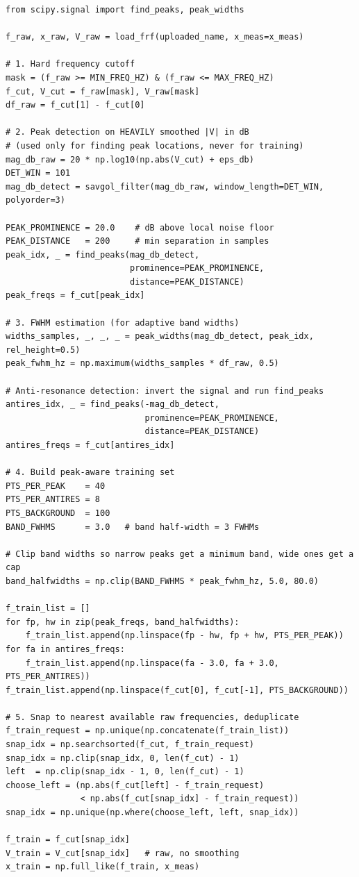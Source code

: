 \documentclass[11pt,a4paper]{article}
\begin{document}
\begin{lstlisting}[caption={Preprocessing: cutoff, peak detection, peak-aware sampling}]
from scipy.signal import find_peaks, peak_widths

f_raw, x_raw, V_raw = load_frf(uploaded_name, x_meas=x_meas)

# 1. Hard frequency cutoff
mask = (f_raw >= MIN_FREQ_HZ) & (f_raw <= MAX_FREQ_HZ)
f_cut, V_cut = f_raw[mask], V_raw[mask]
df_raw = f_cut[1] - f_cut[0]

# 2. Peak detection on HEAVILY smoothed |V| in dB
# (used only for finding peak locations, never for training)
mag_db_raw = 20 * np.log10(np.abs(V_cut) + eps_db)
DET_WIN = 101
mag_db_detect = savgol_filter(mag_db_raw, window_length=DET_WIN, polyorder=3)

PEAK_PROMINENCE = 20.0    # dB above local noise floor
PEAK_DISTANCE   = 200     # min separation in samples
peak_idx, _ = find_peaks(mag_db_detect,
                         prominence=PEAK_PROMINENCE,
                         distance=PEAK_DISTANCE)
peak_freqs = f_cut[peak_idx]

# 3. FWHM estimation (for adaptive band widths)
widths_samples, _, _, _ = peak_widths(mag_db_detect, peak_idx, rel_height=0.5)
peak_fwhm_hz = np.maximum(widths_samples * df_raw, 0.5)

# Anti-resonance detection: invert the signal and run find_peaks
antires_idx, _ = find_peaks(-mag_db_detect,
                            prominence=PEAK_PROMINENCE,
                            distance=PEAK_DISTANCE)
antires_freqs = f_cut[antires_idx]

# 4. Build peak-aware training set
PTS_PER_PEAK    = 40
PTS_PER_ANTIRES = 8
PTS_BACKGROUND  = 100
BAND_FWHMS      = 3.0   # band half-width = 3 FWHMs

# Clip band widths so narrow peaks get a minimum band, wide ones get a cap
band_halfwidths = np.clip(BAND_FWHMS * peak_fwhm_hz, 5.0, 80.0)

f_train_list = []
for fp, hw in zip(peak_freqs, band_halfwidths):
    f_train_list.append(np.linspace(fp - hw, fp + hw, PTS_PER_PEAK))
for fa in antires_freqs:
    f_train_list.append(np.linspace(fa - 3.0, fa + 3.0, PTS_PER_ANTIRES))
f_train_list.append(np.linspace(f_cut[0], f_cut[-1], PTS_BACKGROUND))

# 5. Snap to nearest available raw frequencies, deduplicate
f_train_request = np.unique(np.concatenate(f_train_list))
snap_idx = np.searchsorted(f_cut, f_train_request)
snap_idx = np.clip(snap_idx, 0, len(f_cut) - 1)
left  = np.clip(snap_idx - 1, 0, len(f_cut) - 1)
choose_left = (np.abs(f_cut[left] - f_train_request)
               < np.abs(f_cut[snap_idx] - f_train_request))
snap_idx = np.unique(np.where(choose_left, left, snap_idx))

f_train = f_cut[snap_idx]
V_train = V_cut[snap_idx]   # raw, no smoothing
x_train = np.full_like(f_train, x_meas)
\end{lstlisting}
\end{document}
